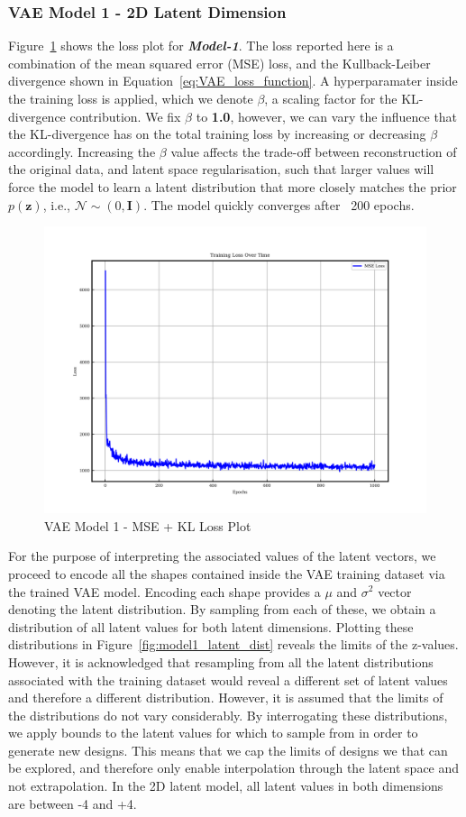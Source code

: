 \documentclass{article}
\begin{document}
\subsubsection{VAE Model 1 - 2D Latent Dimension}

Figure~\ref{fig:model1_loss_plot} shows the loss plot for \textbf{\textit{Model-1}}. The loss reported here is a combination of the mean squared error (MSE) loss, and the Kullback-Leiber divergence shown in Equation~\ref{eq:VAE_loss_function}. A hyperparamater inside the training loss is applied, which we denote $\beta$, a scaling factor for the KL-divergence contribution. We fix $\beta$ to \textbf{1.0}, however, we can vary the influence that the KL-divergence has on the total training loss by increasing or decreasing $\beta$ accordingly. Increasing the $\beta$ value affects the trade-off between reconstruction of the original data, and latent space regularisation, such that larger values will force the model to learn a latent distribution that more closely matches the prior $p(\textbf{z})$, i.e., $\mathcal{N}\sim(0,\textbf{I})$. The model quickly converges after ~200 epochs.
\begin{figure}[H]
\centering
    \includegraphics[width=0.75\linewidth]{figures/VAEmodels/model1/loss_plot.png}
    \caption{VAE Model 1 - MSE + KL Loss Plot}
    \label{fig:model1_loss_plot}
\end{figure}
For the purpose of interpreting the associated values of the latent vectors, we proceed to encode all the shapes contained inside the VAE training dataset via the trained VAE model. Encoding each shape provides a $\mu$ and $\sigma^2$ vector denoting the latent distribution. By sampling from each of these, we obtain a distribution of all latent values for both latent dimensions. Plotting these distributions in Figure~\ref{fig:model1_latent_dist} reveals the limits of the z-values. However, it is acknowledged that resampling from all the latent distributions associated with the training dataset would reveal a different set of latent values and therefore a different distribution. However, it is assumed that the limits of the distributions do not vary considerably. By interrogating these distributions, we apply bounds to the latent values for which to sample from in order to generate new designs. This means that we cap the limits of designs we that can be explored, and therefore only enable interpolation through the latent space and not extrapolation. In the 2D latent model, all latent values in both dimensions are between -4 and +4.
\end{document}

